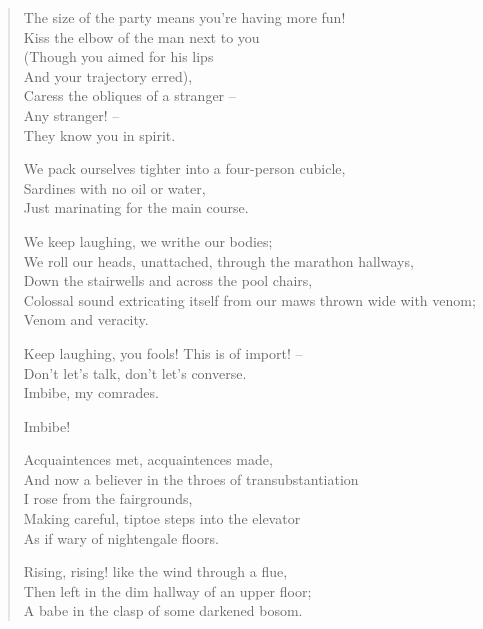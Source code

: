 \begin{verse}
  \secdiv

  The size of the party means you're having more fun!\\
  Kiss the elbow of the man next to you\\
  (Though you aimed for his lips\\
  And your trajectory erred),\\
  Caress the obliques of a stranger --\\
  Any stranger! --\\
  They know you in spirit.\par

  We pack ourselves tighter into a four-person cubicle,\\
  Sardines with no oil or water,\\
  Just marinating for the main course.\par

  We keep laughing, we writhe our bodies;\\
  We roll our heads, unattached, through the marathon hallways,\\
  Down the stairwells and across the pool chairs,\\
  Colossal sound extricating itself from our maws thrown wide with venom;\\
  Venom and veracity.\par

  Keep laughing, you fools! This is of import! --\\
  Don't let's talk, don't let's converse.\\
  Imbibe, my comrades.\par

  Imbibe!\\

  \secdiv

  Acquaintences met, acquaintences made,\\
  And now a believer in the throes of transubstantiation\\
  I rose from the fairgrounds,\\
  Making careful, tiptoe steps into the elevator\\
  As if wary of nightengale floors.\par

  Rising, rising! like the wind through a flue,\\
  Then left in the dim hallway of an upper floor;\\
  A babe in the clasp of some darkened bosom.\par


\end{verse}
